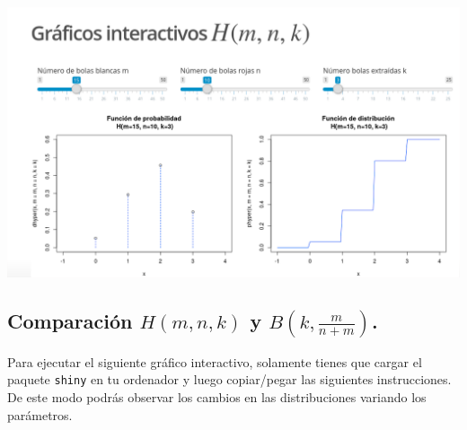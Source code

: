 \documentclass[]{book}
\begin{document}
\href{https://github.com/joanby/probabilidad}{\includegraphics{Images/noshinyImages/interactivos_hiper_geom1.png}}

\hypertarget{comparaciuxf3n-hmnk-y-bleftkfracmnmright.}{%
\subsection{\texorpdfstring{Comparación \(H(m,n,k)\) y \(B\left(k,\frac{m}{n+m}\right)\).}{Comparación H(m,n,k) y B\textbackslash{}left(k,\textbackslash{}frac\{m\}\{n+m\}\textbackslash{}right).}}\label{comparaciuxf3n-hmnk-y-bleftkfracmnmright.}}

Para ejecutar el siguiente gráfico interactivo, solamente tienes que cargar el paquete \texttt{shiny} en tu ordenador y luego copiar/pegar las siguientes instrucciones. De este modo podrás observar los cambios en las distribuciones variando los parámetros.
\end{document}
